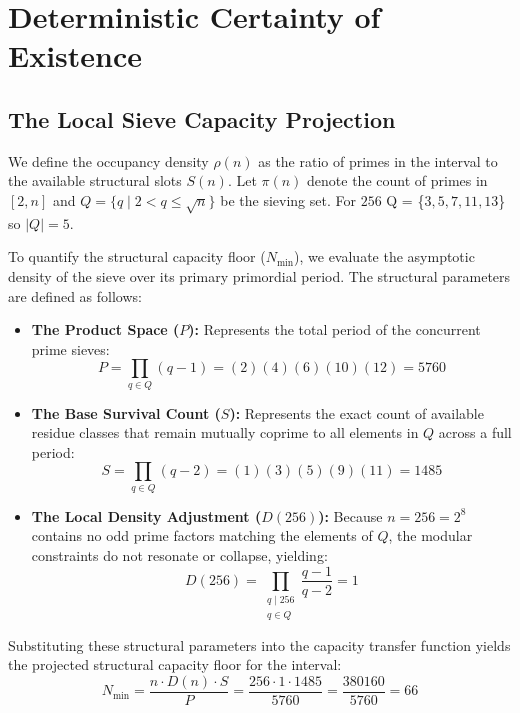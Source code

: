 \documentclass[sn-mathphys-num, pdflatex]{sn-jnl}
\begin{document}
\section{Deterministic Certainty of Existence}
\label{sec:determinism_certainty}

\subsection{The Local Sieve Capacity Projection}
We define the occupancy density $\rho(n)$ as the ratio of primes in the interval to the available structural slots $S(n)$. Let $\pi(n)$ denote the count of primes in $[2, n]$ and $Q = \{q \mid 2 < q \le \sqrt{n}\}$ be the sieving set. For $256$ Q = \{$3, 5, 7, 11, 13$\} so $|Q|=5$.

To quantify the structural capacity floor ($N_{\min}$), we evaluate the asymptotic density of the sieve over its primary primordial period. The structural parameters are defined as follows:

\begin{itemize}
    \item \textbf{The Product Space ($P$):} Represents the total period of the concurrent prime sieves:
    \begin{equation}
        P = \prod_{q \in Q} (q - 1) = (2)(4)(6)(10)(12) = 5760
    \end{equation}
    
    \item \textbf{The Base Survival Count ($S$):} Represents the exact count of available residue classes that remain mutually coprime to all elements in $Q$ across a full period:
    \begin{equation}
        S = \prod_{q \in Q} (q - 2) = (1)(3)(5)(9)(11) = 1485
    \end{equation}
    
    \item \textbf{The Local Density Adjustment ($D(256)$):} Because $n = 256 = 2^8$ contains no odd prime factors matching the elements of $Q$, the modular constraints do not resonate or collapse, yielding:
    \begin{equation}
        D(256) = \prod_{\substack{q \mid 256 \\ q \in Q}} \frac{q - 1}{q - 2} = 1
    \end{equation}
\end{itemize}

Substituting these structural parameters into the capacity transfer function yields the projected structural capacity floor for the interval:
\begin{equation}
    N_{\min} = \frac{n \cdot D(n) \cdot S}{P} = \frac{256 \cdot 1 \cdot 1485}{5760} = \frac{380160}{5760} = 66
\end{equation}
\end{document}
